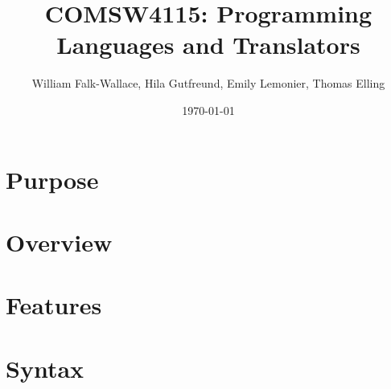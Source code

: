 \documentclass[letterpaper,fleqn,6pt]{article}
\author{William Falk-Wallace, Hila Gutfreund, Emily Lemonier, Thomas Elling}
\title{COMSW4115: Programming Languages and Translators}
\date{\today}
\begin{document}
\maketitle

\section{Purpose}
\section{Overview}
\section{Features}
\section{Syntax}
\end{document}
